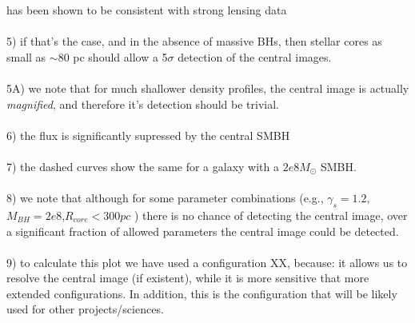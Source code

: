 \documentclass[chicago]{emulateapj}
\begin{document}
\begin{framed}
has been shown to be consistent with strong lensing data \\ \\
5) if that's the case, and in the absence of massive BHs, then stellar cores as small as $\sim80$ pc should allow a 5$\sigma$ detection of the central images. \\ \\
5A) we note that for much shallower density profiles, the central image is actually \emph{magnified}, and therefore it's detection should be trivial.\\ \\
6) the flux is significantly supressed by the central SMBH \\  \\
7) the dashed curves show the same for a galaxy with a $2e8M_{\odot}$ SMBH. \\ \\
8) we note that although for some parameter combinations (e.g., $\gamma_{s}=1.2,$ $M_{BH} = 2e8$,$R_{core}<300 pc$ ) there is no chance of detecting the central image, over a significant fraction of allowed parameters the central image could be detected. \\ \\
9) to calculate this plot we have used a configuration XX, because: it allows us to resolve the central image (if existent), while it is more sensitive that more extended configurations.  In addition, this is the configuration that will be likely used for other projects/sciences.
\end{framed}
\end{document}
